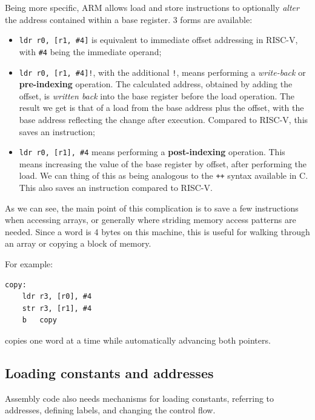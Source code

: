 \documentclass[a4paper,11pt]{article}
\begin{document}
Being more specific, ARM allows load and store instructions to optionally \textit{alter} the address contained within a base register.
3 forms are available:
\begin{itemize}
	\item \lstinline|ldr r0, [r1, #4]| is equivalent to immediate offset addressing in RISC-V, with \lstinline|#4| being the immediate operand;
	\item \lstinline|ldr r0, [r1, #4]!|, with the additional \lstinline|!|, means performing a \textit{write-back} or \textbf{pre-indexing} operation. The calculated address, obtained by adding the offset, is \textit{written back} into the base register before the load operation. The result we get is that of a load from the base address plus the offset, with the base address reflecting the change after execution. Compared to RISC-V, this saves an instruction;
	\item \lstinline|ldr r0, [r1], #4| means performing a \textbf{post-indexing} operation. This means increasing the value of the base register by offset, after performing the load. We can thing of this as being analogous to the \lstinline|++| syntax available in C. This also saves an instruction compared to RISC-V.
\end{itemize}

As we can see, the main point of this complication is to save a few instructions when accessing arrays, or generally where striding memory access patterns are needed.
Since a word is 4 bytes on this machine, this is useful for walking through an array or
copying a block of memory.

For example:

\begin{lstlisting}[language=arm]
copy:
    ldr r3, [r0], #4
    str r3, [r1], #4
    b   copy
\end{lstlisting}

copies one word at a time while automatically advancing both pointers.

\subsection{Loading constants and addresses}

Assembly code also needs mechanisms for loading constants, referring to
addresses, defining labels, and changing the control flow.
\end{document}
